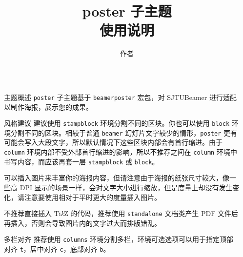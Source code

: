 \documentclass{ctexbeamer}
\begin{document}
\title{poster 子主题\\使用说明}
\author{作者}
\logo{\zhlogo}
\begin{frame}[fragile]
  \begin{columns}[T]
    \begin{column}{.45\textwidth}

      \begin{stampblock}{主题概述}
        \texttt{poster} 子主题基于 \texttt{beamerposter} 宏包\cite{beamerposter}，对
        SJTUBeamer 进行适配以制作海报，展示您的成果。
      \end{stampblock}

      \begin{stampblock}{风格建议}
        建议使用 \texttt{stampblock} 环境分割不同的区块。你也可以使用 \texttt{block}
        环境分割不同的区块。相较于普通 \texttt{beamer} 幻灯片文字较少的情形，\texttt{poster}
        更有可能会写入大段文字，所以默认情况下这些区块内部会有首行缩进。由于 \texttt{column}
        环境内部不受外部首行缩进的影响，所以不推荐之间在
        \texttt{column} 环境中书写内容，而应该再套一层 \texttt{stampblock} 或 \texttt{block}。

        可以插入图片来丰富你的海报内容，但请注意由于海报的纸张尺寸较大，像一些高 DPI
        显示的场景一样，会对文字大小进行缩放，但是度量上却没有发生变化，请注意要使用相对于平时更大的度量插入图片。

        不推荐直接插入 Ti\emph{k}Z 的代码，推荐使用 \texttt{standalone} 文档类产生 PDF
        文件后再插入，否则会导致图片内的文字过大而排版错乱。
      \end{stampblock}

      \begin{stampblock}{多栏对齐}
        推荐使用 \texttt{columns} 环境分割多栏，环境可选选项可以用于指定顶部对齐 \texttt{t}，居中对齐
        \texttt{c}，底部对齐 \texttt{b}。

      \end{stampblock}

    \end{column}
    \begin{column}{.45\textwidth}


\end{column}
\end{columns}
\end{frame}
\end{document}
